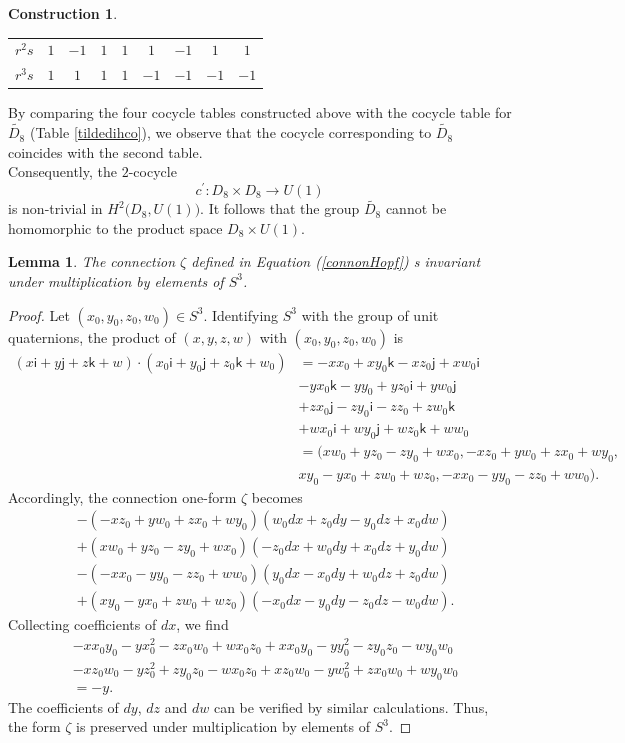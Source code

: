 \documentclass{article}
\theoremstyle{plain}
\newtheorem{lem}[thm]{Lemma}
\theoremstyle{definition}
\newtheorem{const}[thm]{Construction}
\begin{document}
\begin{const}
\begin{table}[H]
\begin{tabular}{ c | c   c   c   c   c   c   c   c}
$r^2s$ & $1$ & $-1$ & $1$ & $1$ & $1$ & $-1$ & $1$ & $1$ \\
$r^3s$ & $1$ & $1$ & $1$ & $1$ & $-1$ & $-1$ & $-1$ & $-1$
\end{tabular}
\end{table}
By comparing the four cocycle tables constructed above with the cocycle table for $\widetilde{D_8}$ (Table \ref{tildedihco}), we observe that the cocycle corresponding to $\widetilde{D_8}$ coincides with the second table. \\
Consequently, the $2$-cocycle $$c^\prime:D_8 \times D_8 \longrightarrow U(1)$$
is non-trivial in $H^2\bigl(D_8,U(1)\bigr)$. It follows that the group $\widetilde{D_8}$ cannot be homomorphic to the product space $D_8 \times U(1)$.
\end{const}
\begin{lem}
The connection $\zeta$ defined in Equation (\ref{connonHopf}) s invariant under multiplication by elements of $S^3$.
\end{lem}
\begin{proof}
Let $(x_0,y_0,z_0,w_0) \in S^3$. Identifying $S^3$ with the group of unit quaternions, the product of $(x,y,z,w)$ with $(x_0,y_0,z_0,w_0)$ is
\begin{align*}
(x\mathsf{i}+y\mathsf{j}+z\mathsf{k}+w) \cdot (x_0\mathsf{i}+y_0\mathsf{j}+z_0\mathsf{k}+w_0) & = -xx_0 + xy_0\mathsf{k}-xz_0\mathsf{j}+xw_0\mathsf{i} \\
& - yx_0\mathsf{k} - yy_0 + yz_0\mathsf{i} + yw_0\mathsf{j} \\
& + zx_0\mathsf{j} - zy_0\mathsf{i} -zz_0 +zw_0\mathsf{k} \\
& + wx_0\mathsf{i} +wy_0\mathsf{j} + wz_0\mathsf{k} + ww_0 \\
& = (xw_0+yz_0-zy_0+wx_0,-xz_0+yw_0+zx_0+wy_0, \\
& xy_0-yx_0+zw_0+wz_0,-xx_0-yy_0-zz_0+ww_0).
\end{align*}
Accordingly, the connection one-form $\zeta$ becomes
\begin{align*}
& - (-xz_0+yw_0+zx_0+wy_0)(w_0dx+z_0dy-y_0dz+x_0dw) \\ & + (xw_0+yz_0-zy_0+wx_0)(-z_0dx+w_0dy+x_0dz+y_0dw) \\ & - (-xx_0-yy_0-zz_0+ww_0)(y_0dx-x_0dy+w_0dz+z_0dw) \\ & + (xy_0-yx_0+zw_0+wz_0)(-x_0dx-y_0dy-z_0dz-w_0dw).
\end{align*}
Collecting coefficients of $dx$, we find
\begin{align*}
& -xx_0y_0-yx_0^2-zx_0w_0+wx_0z_0+xx_0y_0-yy_0^2-zy_0z_0-wy_0w_0 \\ 
& -xz_0w_0-yz_0^2+zy_0z_0-wx_0z_0+xz_0w_0-yw_0^2+zx_0w_0+wy_0w_0 \\
& = -y.
\end{align*}
The coefficients of $dy$, $dz$ and $dw$ can be verified by similar calculations. Thus, the form $\zeta$ is preserved under multiplication by elements of $S^3$.
\end{proof}
\end{document}

